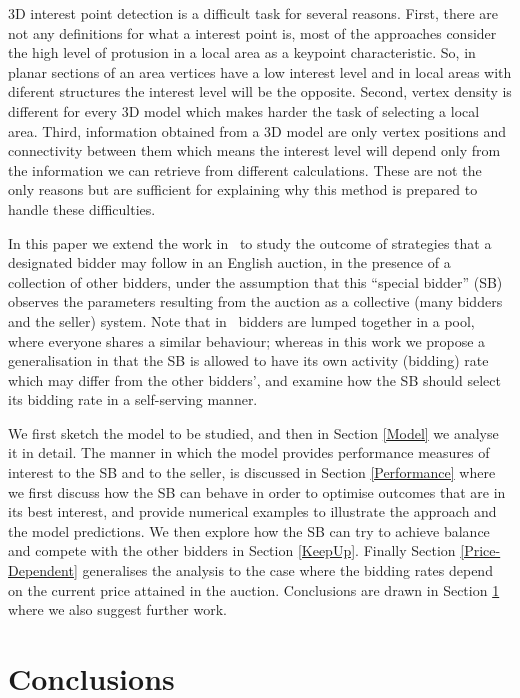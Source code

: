 \documentclass{comjnl}
\begin{document}
3D interest point detection is a difficult task for several reasons. 
First, there are not any definitions for what a interest point is, 
most of the approaches consider the high level of protusion in a local
area as a keypoint characteristic. So, in planar sections of an area
vertices have a low interest level and in local areas with diferent
structures the interest level will be the opposite. Second, vertex 
density is different for every 3D model which makes harder the task of
selecting a local area. Third, information obtained from a 3D model
are only vertex positions and connectivity between them which means
the interest level will depend only from the information we can
retrieve from different calculations. These are not the only reasons
but are sufficient for explaining why this method is prepared to
handle these difficulties. 

In this paper we extend the work in~\cite{gelenbe06} to study the
outcome of strategies that a designated bidder may follow in an
English auction, in the presence of a collection of other bidders,
under the assumption that this ``special bidder'' (SB) observes
the parameters resulting from the auction as a collective (many
bidders and the seller) system. Note that in~\cite{gelenbe06}
bidders are lumped together in a pool, where everyone shares a
similar behaviour; whereas in this work we propose a
generalisation in that the SB is allowed to have its own activity
(bidding) rate which may differ from the other bidders', and
examine how the SB should select its bidding rate in a
self-serving manner.

We first sketch the model to be studied, and then in Section
\ref{Model} we analyse it in detail. The manner in which the model
provides performance measures of interest to the SB and to the
seller, is discussed in Section \ref{Performance} where we first
discuss how the SB can behave in order to optimise outcomes that
are in its best interest, and provide  numerical examples to
illustrate the approach and the model predictions. We then explore
how the SB can try to achieve balance and compete with the other
bidders in Section \ref{KeepUp}. Finally Section
\ref{Price-Dependent} generalises the analysis to the case where
the bidding rates depend on the current price attained in the
auction. Conclusions are drawn in Section \ref{Conclusions} where
we also suggest further work.


\section{Conclusions} \label{Conclusions}




\nocite{*}


% 

\end{document}
